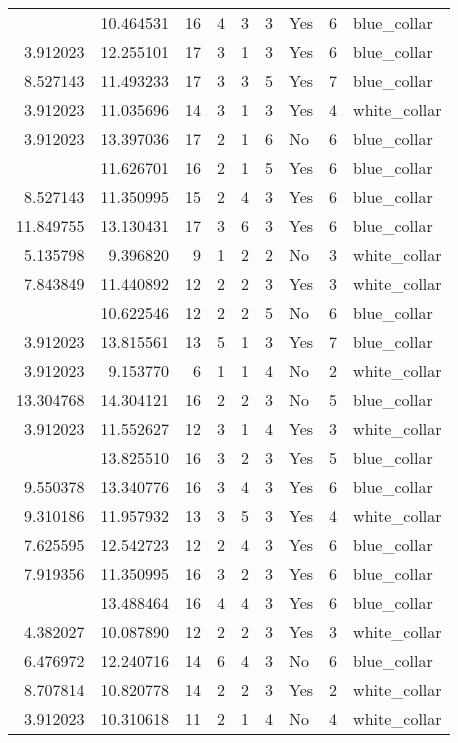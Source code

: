 \documentclass[
]{article}
\begin{document}
\begin{longtable}[t]{rrrrrllrl}
\addlinespace
8.255828 & 10.464531 & 16 & 4 & 3 & 3 & Yes & 6 & blue\_collar\\
3.912023 & 12.255101 & 17 & 3 & 1 & 3 & Yes & 6 & blue\_collar\\
8.527143 & 11.493233 & 17 & 3 & 3 & 5 & Yes & 7 & blue\_collar\\
3.912023 & 11.035696 & 14 & 3 & 1 & 3 & Yes & 4 & white\_collar\\
3.912023 & 13.397036 & 17 & 2 & 1 & 6 & No & 6 & blue\_collar\\
\addlinespace
3.912023 & 11.626701 & 16 & 2 & 1 & 5 & Yes & 6 & blue\_collar\\
8.527143 & 11.350995 & 15 & 2 & 4 & 3 & Yes & 6 & blue\_collar\\
11.849755 & 13.130431 & 17 & 3 & 6 & 3 & Yes & 6 & blue\_collar\\
5.135798 & 9.396820 & 9 & 1 & 2 & 2 & No & 3 & white\_collar\\
7.843849 & 11.440892 & 12 & 2 & 2 & 3 & Yes & 3 & white\_collar\\
\addlinespace
7.130899 & 10.622546 & 12 & 2 & 2 & 5 & No & 6 & blue\_collar\\
3.912023 & 13.815561 & 13 & 5 & 1 & 3 & Yes & 7 & blue\_collar\\
3.912023 & 9.153770 & 6 & 1 & 1 & 4 & No & 2 & white\_collar\\
13.304768 & 14.304121 & 16 & 2 & 2 & 3 & No & 5 & blue\_collar\\
3.912023 & 11.552627 & 12 & 3 & 1 & 4 & Yes & 3 & white\_collar\\
\addlinespace
9.905984 & 13.825510 & 16 & 3 & 2 & 3 & Yes & 5 & blue\_collar\\
9.550378 & 13.340776 & 16 & 3 & 4 & 3 & Yes & 6 & blue\_collar\\
9.310186 & 11.957932 & 13 & 3 & 5 & 3 & Yes & 4 & white\_collar\\
7.625595 & 12.542723 & 12 & 2 & 4 & 3 & Yes & 6 & blue\_collar\\
7.919356 & 11.350995 & 16 & 3 & 2 & 3 & Yes & 6 & blue\_collar\\
\addlinespace
12.100990 & 13.488464 & 16 & 4 & 4 & 3 & Yes & 6 & blue\_collar\\
4.382027 & 10.087890 & 12 & 2 & 2 & 3 & Yes & 3 & white\_collar\\
6.476972 & 12.240716 & 14 & 6 & 4 & 3 & No & 6 & blue\_collar\\
8.707814 & 10.820778 & 14 & 2 & 2 & 3 & Yes & 2 & white\_collar\\
3.912023 & 10.310618 & 11 & 2 & 1 & 4 & No & 4 & white\_collar\\

\end{longtable}
\end{document}
